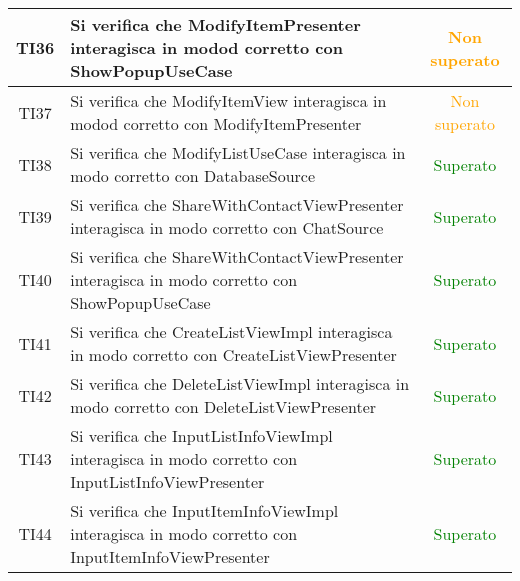 \begin{center}
\begin{longtable}{|c|>{\centering}m{10cm}|c|}
		TI36 & Si verifica che ModifyItemPresenter interagisca in modod corretto con ShowPopupUseCase & \textcolor{Orange}{Non superato}\\ \hline
		TI37 & Si verifica che ModifyItemView interagisca in modod corretto con ModifyItemPresenter & \textcolor{Orange}{Non superato}\\ \hline
		TI38 & Si verifica che ModifyListUseCase interagisca in modo corretto con DatabaseSource & \textcolor{Green}{Superato}\\ \hline
		TI39 & Si verifica che ShareWithContactViewPresenter interagisca in modo corretto con ChatSource & \textcolor{Green}{Superato}\\ \hline
		TI40 & Si verifica che ShareWithContactViewPresenter interagisca in modo corretto con ShowPopupUseCase & \textcolor{Green}{Superato}\\ \hline
		TI41 & Si verifica che CreateListViewImpl interagisca in modo corretto con CreateListViewPresenter & \textcolor{Green}{Superato}\\ \hline
		TI42 & Si verifica che DeleteListViewImpl interagisca in modo corretto con DeleteListViewPresenter & \textcolor{Green}{Superato}\\ \hline
		TI43 & Si verifica che InputListInfoViewImpl interagisca in modo corretto con InputListInfoViewPresenter & \textcolor{Green}{Superato}\\ \hline
		TI44 & Si verifica che InputItemInfoViewImpl interagisca in modo corretto con InputItemInfoViewPresenter & \textcolor{Green}{Superato}\\ \hline
	\end{longtable}
\end{center}
